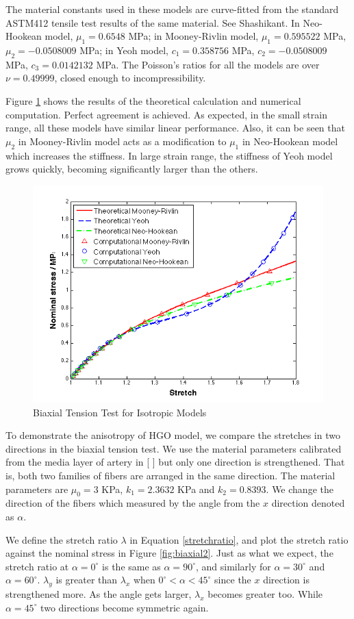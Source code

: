 The material constants used in these models are curve-fitted from the standard ASTM412 tensile test results of the same material. See Shashikant. In Neo-Hookean model, $\mu_1 = 0.6548$ MPa; in Mooney-Rivlin model, $\mu_1 = 0.595522$ MPa, $\mu_2 = -0.0508009$ MPa; in Yeoh model, $c_1 = 0.358756$ MPa, $c_2 = - 0.0508009$ MPa, $c_3 = 0.0142132$ MPa. The Poisson's ratios for all the models are over $\nu = 0.49999$, closed enough to incompressibility.

Figure \ref{fig:biaxial1} shows the results of the theoretical calculation and numerical computation. Perfect agreement is achieved. As expected, in the small strain range, all these models have similar linear performance. Also, it can be seen that $\mu_2$ in Mooney-Rivlin model acts as a modification to $\mu_1$ in Neo-Hookean model which increases the stiffness. In large strain range, the stiffness of Yeoh model grows quickly, becoming significantly larger than the others.

\begin{figure}[h!]
\centering
\includegraphics[width=.6\textwidth]{./figures/biaxial1.png}
\caption{Biaxial Tension Test for Isotropic Models}
\label{fig:biaxial1}
\end{figure}

To demonstrate the anisotropy of HGO model, we compare the stretches in two directions in the biaxial tension test. We use the material parameters calibrated from the media layer of artery in [ ] but only one direction is strengthened. That is, both two families of fibers are arranged in the same direction. The material parameters are $\mu_0 = 3$ KPa, $k_1 = 2.3632$ KPa and $k_2 = 0.8393$. We change the direction of the fibers which measured by the angle from the $x$ direction denoted as $\alpha$. 

We define the stretch ratio $\lambda$ in Equation \ref{stretchratio}, and plot the stretch ratio against the nominal stress in Figure \ref{fig:biaxial2}. Just as what we expect, the stretch ratio at $\alpha = 0^\circ$ is the same as $\alpha = 90^\circ$, and similarly for $\alpha = 30^\circ$ and $\alpha = 60^\circ$. 
$\lambda_y$ is greater than $\lambda_x$ when $0^\circ < \alpha < 45^\circ$ since the $x$ direction is strengthened more. As the angle gets larger, $\lambda_x$ becomes greater too. While $\alpha = 45^\circ$ two directions become symmetric again.


